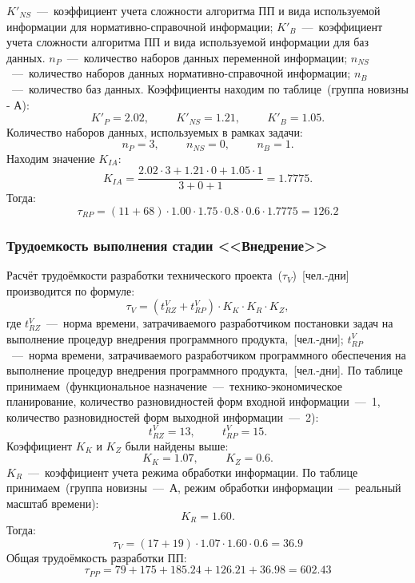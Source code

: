             $K'_{NS}$~---~коэффициент учета сложности алгоритма ПП и вида используемой информации для нормативно-справочной информации;
            $K'_B$~---~коэффициент учета сложности алгоритма ПП и вида используемой информации для баз данных.
            $n_P$~---~количество наборов данных переменной информации;
            $n_{NS}$~---~количество наборов данных нормативно-справочной информации;
            $n_B$~---~количество баз данных.
            Коэффициенты находим по таблице~(группа новизны - А):
            $$K'_P=2.02, \hspace{1cm} K'_{NS}=1.21, \hspace{1cm} K'_B=1.05.$$
            Количество наборов данных, используемых в рамках задачи:
            $$n_P=3, \hspace{1cm} n_{NS}=0,\hspace{1cm} n_B=1.$$
            Находим значение $K_{IA}$:
            $$K_{IA} = \dfrac{2.02\cdot 3+1.21\cdot 0+1.05\cdot 1}{3+0+1}=1.7775.$$
            Тогда:
            $$\tau_{RP} = (11+68)\cdot 1.00\cdot 1.75\cdot 0.8\cdot 0.6\cdot 1.7775 = 126.2$$


        \subsubsection{Трудоемкость выполнения стадии <<Внедрение>>}
            Расчёт трудоёмкости разработки технического проекта~($\tau_{V}$)~[чел.-дни] производится по формуле:
            $$\tau_{V} = (t^V_{RZ} + t^V_{RP})\cdot K_K\cdot K_R\cdot K_Z,$$
            где $t^V_{RZ}$~---~норма времени, затрачиваемого разработчиком постановки задач на выполнение процедур внедрения программного продукта,~[чел.-дни];
            $t^V_{RP}$~---~норма времени, затрачиваемого разработчиком программного обеспечения на выполнение процедур внедрения программного продукта,~[чел.-дни].
            По таблице принимаем~(функциональное назначение~---~технико-экономическое планирование,
            количество разновидностей форм входной информации~---~1,
            количество разновидностей форм выходной информации~---~2):
            $$t^V_{RZ} = 13,\hspace{1cm} t^V_{RP} = 15.$$
            Коэффициент $K_K$ и $K_Z$ были найдены выше:
            $$K_K=1.07, \hspace{1cm} K_Z=0.6.$$
            $K_R$~---~коэффициент учета режима обработки информации. По таблице принимаем~(группа новизны~---~А, режим обработки информации~---~реальный масштаб времени):
            $$K_R = 1.60.$$
            Тогда:
            $$\tau_{V} = (17+19)\cdot 1.07\cdot 1.60\cdot 0.6= 36.9$$
        Общая трудоёмкость разработки ПП:
        $$\tau_{PP} = 79+175+185.24+126.21+36.98= 602.43$$

